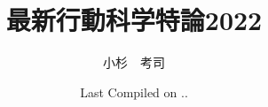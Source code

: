 \documentclass[dvipsnames]{ltjsbook}
\begin{document}

\VerbatimFootnotes
\title{最新行動科学特論2022}
\author{小杉　考司}
\date{Last Compiled on \number\year .\number\month .\number\day}
\maketitle
\setcounter{tocdepth}{1}

\tableofcontents
















\appendix





\printindex
\end{document}
